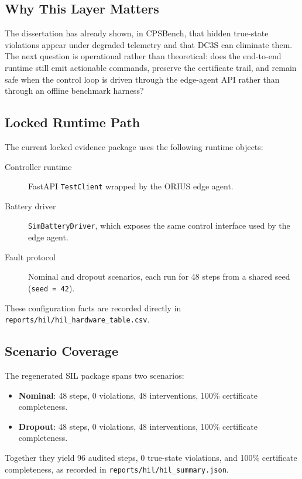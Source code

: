 \subsection{Why This Layer Matters}

The dissertation has already shown, in CPSBench, that hidden
true-state violations appear under degraded telemetry and that DC3S can
eliminate them.  The next question is operational rather than theoretical:
does the end-to-end runtime still emit actionable commands, preserve the
certificate trail, and remain safe when the control loop is driven through
the edge-agent API rather than through an offline benchmark harness?

\subsection{Locked Runtime Path}

The current locked evidence package uses the following runtime objects:

\begin{description}
  \item[Controller runtime] FastAPI \texttt{TestClient} wrapped by the
    ORIUS edge agent.
  \item[Battery driver] \texttt{SimBatteryDriver}, which exposes the same
    control interface used by the edge agent.
  \item[Fault protocol] Nominal and dropout scenarios, each run for
    48 steps from a shared seed (\texttt{seed = 42}).
\end{description}

These configuration facts are recorded directly in
\texttt{reports/hil/hil\_hardware\_table.csv}.

\subsection{Scenario Coverage}

The regenerated SIL package spans two scenarios:

\begin{itemize}
  \item \textbf{Nominal}: 48 steps, 0 violations, 48 interventions,
    100\% certificate completeness.
  \item \textbf{Dropout}: 48 steps, 0 violations, 48 interventions,
    100\% certificate completeness.
\end{itemize}

Together they yield 96 audited steps, 0 true-state violations, and 100\%
certificate completeness, as recorded in
\texttt{reports/hil/hil\_summary.json}.

